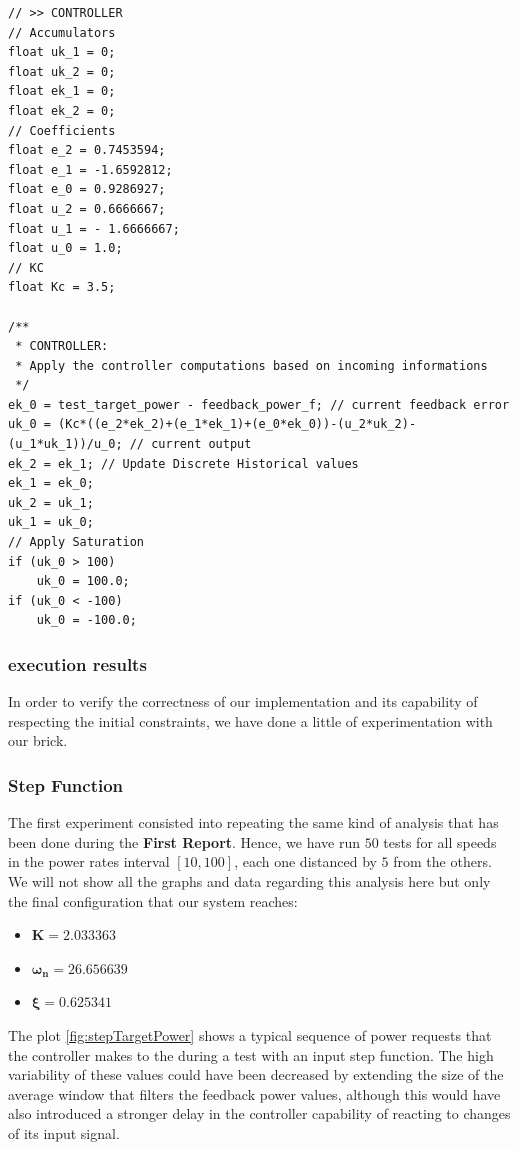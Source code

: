 \begin{lstlisting}
// >> CONTROLLER
// Accumulators
float uk_1 = 0;
float uk_2 = 0;
float ek_1 = 0;
float ek_2 = 0;
// Coefficients
float e_2 = 0.7453594;
float e_1 = -1.6592812;
float e_0 = 0.9286927;
float u_2 = 0.6666667;
float u_1 = - 1.6666667;
float u_0 = 1.0;
// KC
float Kc = 3.5;

/**
 * CONTROLLER:
 * Apply the controller computations based on incoming informations
 */
ek_0 = test_target_power - feedback_power_f; // current feedback error
uk_0 = (Kc*((e_2*ek_2)+(e_1*ek_1)+(e_0*ek_0))-(u_2*uk_2)-(u_1*uk_1))/u_0; // current output
ek_2 = ek_1; // Update Discrete Historical values
ek_1 = ek_0;
uk_2 = uk_1;
uk_1 = uk_0;
// Apply Saturation
if (uk_0 > 100)
	uk_0 = 100.0;
if (uk_0 < -100)
	uk_0 = -100.0;

\end{lstlisting}

\subsubsection{\LEGOMOTOR{} execution results}

In order to verify the correctness of our implementation and its capability of respecting the initial constraints, we have done a little of experimentation with our brick.

\subsubsection*{Step Function}
The first experiment consisted into repeating the same kind of analysis that has been done during the \textbf{First Report}. Hence, we have run $50$ tests for all speeds in the power rates interval $[10,100]$, each one distanced by $5$ from the others. We will not show all the graphs and data regarding this analysis here but only the final configuration that our \LEGOMOTOR{} system reaches:

\begin{itemize}
	\item $\mathbf{K} = 2.033363$
	\item $\mathbf{\omega_n} = 26.656639$
	\item $\mathbf{\xi} = 0.625341$
\end{itemize}

The plot \ref{fig:stepTargetPower} shows a typical sequence of power requests that the controller makes to the \LEGOMOTOR{} during a test with an input step function. The high variability of these values could have been decreased by extending the size of the average window that filters the feedback power values, although this would have also introduced a stronger delay in the controller capability of reacting to changes of its input signal.

